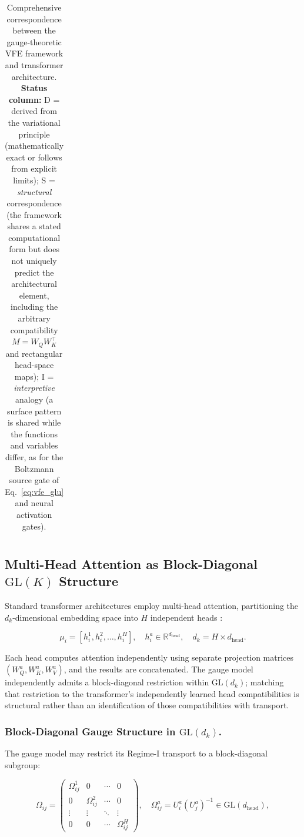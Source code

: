 \documentclass[twoside,11pt]{article}
\begin{document}
\begin{table}[p]
\begin{tabular}{|l|l|l|c|}
\hline
\end{tabular}
\caption{Comprehensive correspondence between the gauge-theoretic VFE framework and transformer architecture. \textbf{Status column:} D = derived from the variational principle (mathematically exact or follows from explicit limits); S = \emph{structural} correspondence (the framework shares a stated computational form but does not uniquely predict the architectural element, including the arbitrary compatibility $M = W_QW_K^\top$ and rectangular head-space maps); I = \emph{interpretive} analogy (a surface pattern is shared while the functions and variables differ, as for the Boltzmann source gate of Eq.~\ref{eq:vfe_glu} and neural activation gates).}
\label{tab:fep_nn_correspondence}
\end{table}


\subsection{Multi-Head Attention as Block-Diagonal $\mathrm{GL}(K)$ Structure}
\label{sec:multihead}

Standard transformer architectures employ multi-head attention, partitioning the $d_k$-dimensional embedding space into $H$ independent heads \citep{vaswani2017attention}:

\begin{equation}
\mu_i = [h_i^1, h_i^2, \ldots, h_i^H], \quad h_i^a \in \mathbb{R}^{d_{\text{head}}}, \quad d_k = H \times d_{\text{head}}.
\end{equation}

Each head computes attention independently using separate projection matrices $(W_Q^a, W_K^a, W_V^a)$, and the results are concatenated. The gauge model independently admits a block-diagonal restriction within $\mathrm{GL}(d_k)$; matching that restriction to the transformer's independently learned head compatibilities is structural rather than an identification of those compatibilities with transport.

\subsubsection{Block-Diagonal Gauge Structure in $\mathrm{GL}(d_k)$.}

The gauge model may restrict its Regime-I transport to a block-diagonal subgroup:

\begin{equation}
\Omega_{ij} = \begin{pmatrix}
\Omega_{ij}^1 & 0 & \cdots & 0 \\
0 & \Omega_{ij}^2 & \cdots & 0 \\
\vdots & \vdots & \ddots & \vdots \\
0 & 0 & \cdots & \Omega_{ij}^H
\end{pmatrix}, \quad \Omega_{ij}^a = U_i^a(U_j^a)^{-1} \in \mathrm{GL}(d_{\text{head}}),
\end{equation}
\end{document}
